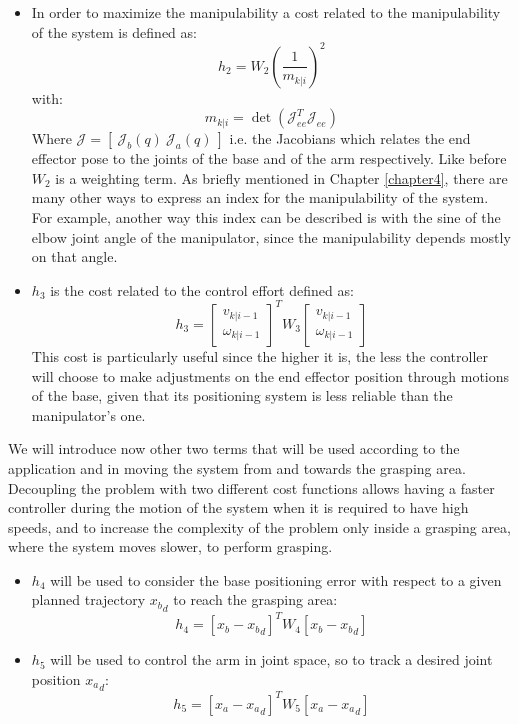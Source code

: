 \begin{itemize}
\item In order to maximize the manipulability a cost related to the manipulability of the system is defined as:
\begin{equation}
h_2 = W_2 \left( \frac{1}{m_{k|i}} \right)^2
\end{equation}
with:
\begin{equation}
m_{k|i} =  \det(\mathcal{J}_{ee}^T\mathcal{J}_{ee})
\end{equation}
Where $\mathcal{J}=[\ \mathcal{J}_b(q)\ \mathcal{J}_a(q)\ ]$ i.e. the Jacobians which relates the end effector pose to the joints of the base and of the arm respectively. Like before $W_2$ is a weighting term. As briefly mentioned in Chapter \ref{chapter4}, there are many other ways to express an index for the manipulability of the system. For example, another way this index can be described is with the sine of the elbow joint angle of the manipulator, since the manipulability depends mostly on that angle.
    
\item $h_3$ is the cost related to the control effort defined as: 
	\begin{equation}
	        h_3=\left[ \begin{matrix} v_{k|i-1} \\ \omega_{k|i-1} \end{matrix}\right]^T W_3 \left[ \begin{matrix} v_{k|i-1} \\ \omega_{k|i-1} \end{matrix}\right]
	 \end{equation}
This cost is particularly useful since the higher it is, the less the controller will choose to make adjustments on the end effector position through motions of the base, given that its positioning system is less reliable than the manipulator's one.
\end{itemize}
We will introduce now other two terms that will be used according to the application and in moving the system from and towards the grasping area. Decoupling the problem with two different cost functions allows having a faster controller during the motion of the system when it is required to have high speeds, and to increase the complexity of the problem only inside a grasping area, where the system moves slower, to perform grasping. 
\begin{itemize}
    \item $h_4$ will be used to consider the base positioning error with respect to a given planned trajectory ${x_b}_d$ to reach the grasping area:
        \begin{equation}
            h_4=[x_b-{x_b}_d]^T W_4 [x_b-{x_b}_d]
        \end{equation}
     \item $h_5$ will be used to control the arm in joint space, so to track a desired joint position ${x_a}_d$:
    \begin{equation}
       h_5=[x_a-{x_a}_d]^T W_5 [x_a-{x_a}_d]
    \end{equation}
\end{itemize}
